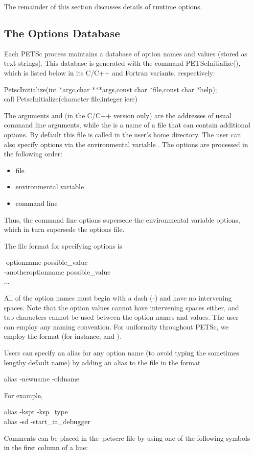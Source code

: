 {{The remainder of this section discusses details of runtime options.

\subsection{The Options Database}

Each PETSc process maintains a database of option names and values
(stored as text strings). This database is generated with the command
PETScInitialize(), which is listed below in its C/C++ and
Fortran variants, respectively:
\begin{tabbing}
  PetscInitialize(int *argc,char ***args,const char *file,const char *help);\\
   call PetscInitialize(character file,integer ierr)
\end{tabbing}
The arguments  and  (in the C/C++ version only) are
the addresses of usual command line arguments, while the  is a name of
a file that can contain additional options. 
By default this file is called   in the 
user's home directory.  The user can also specify options via the
environmental variable .   
The options are processed in the following order:
\begin{itemize}
\item file
\item environmental variable
\item command line
\end{itemize}
Thus, the command line options supersede the environmental variable
options, which in turn supersede the options file.  

The file format for specifying options is 
\begin{tabbing}
   -optionname possible\_value\\
   -anotheroptionname possible\_value\\
   ...
\end{tabbing}
All of the option names must begin with a dash (-) and have no intervening 
spaces.  Note that the option values cannot
have intervening spaces either, and tab characters cannot be used
between the option names and values.
The user can employ any naming convention.  For uniformity throughout
PETSc, we employ the format  (for instance, 
 and ).

Users can specify an alias for any option name (to avoid typing the 
sometimes lengthy default name) by adding an alias to the 
  file in the format
 
\begin{tabbing}
   alias -newname -oldname
\end{tabbing}
For example,
\begin{tabbing}
   alias -kspt -ksp\_type\\
   alias -sd -start\_in\_debugger
\end{tabbing}
Comments can be placed in the .petscrc file by using one of the
following symbols in the first column of a line: \trl{#, %

}}}
